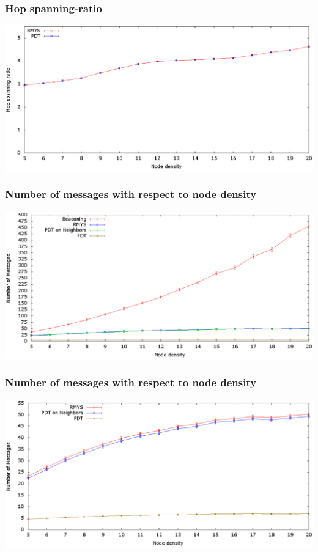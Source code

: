 \documentclass[compress]{beamer}
\begin{document}
\begin{frame} 
\frametitle{Hop spanning-ratio}
\center	\includegraphics[width=1.0\linewidth]{RMYS_PDT_HopSpanningRatio.eps}
\end{frame}


\begin{frame} 
\frametitle{Number of messages with respect to node density}
\center	\includegraphics[width=1.0\linewidth]{RMYS_PDT_Beaconing_Neighbors.eps}
\end{frame}

\begin{frame} 
\frametitle{Number of messages with respect to node density}
\center	\includegraphics[width=1.0\linewidth]{RMYS_PDT_Neighbors.eps}
\end{frame}
\end{document}
